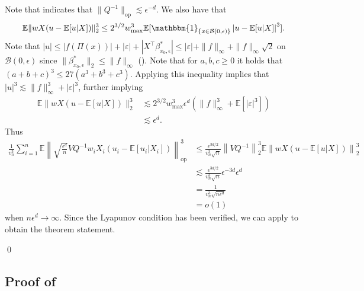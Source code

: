 \documentclass[11pt]{article}
\begin{document}
Note that  indicates that $\|Q^{-1}\|_{\text{op}} \lesssim \epsilon^{-d}$. We also have that 
\[\mathbb{E}\|wX(u - \mathbb{E}[u|X])\|_2^3 \leq 2^{3/2}w^3_{\max}\mathbb{E}[\mathbbm{1}_{\{x \in \mathcal{B}(0, \epsilon)\}}\left|u - \mathbb{E}[u|X]\right|^3].\] 
Note that $|u| \leq |f(\Pi(x))| + |\varepsilon| + |X^{\top}\beta^*_{x_0, \epsilon}| \leq |\varepsilon| + \|f\|_{\infty} + \|f\|_\infty\sqrt{2}$ on $\mathcal{B}(0, \epsilon)$ since $\|\beta^*_{x_0, \epsilon}\|_2 \leq \|f\|_{\infty}$ (). Note that for $a, b, c \geq 0$ it holds that $(a + b + c)^3 \leq 27(a^3 + b^3 + c^3)$. Applying this inequality implies that $|u|^3 \lesssim \|f\|^{3}_{\infty} + |\varepsilon|^3$, further implying
\begin{align*}
    \mathbb{E}\|wX(u - \mathbb{E}[u|X])\|_2^3 &\lesssim  2^{3/2}w^3_{\max}\epsilon^d(\|f\|_{\infty}^3+ \mathbb{E}[|\varepsilon|^3]) \\
    &\lesssim \epsilon^d.
\end{align*}
Thus
\begin{align*}
     \frac{1}{v_n^{3}}\sum_{i = 1}^n\mathbb{E}\left\|\sqrt{\frac{\epsilon^{d}}{n}}VQ^{-1}w_iX_i(u_i - \mathbb{E}[u_i|X_i])\right\|_{\text{op}}^3 
     &\leq  \frac{\epsilon^{3d/2}}{v_n^3\sqrt{n}}\left\|VQ^{-1}\right\|_2^3\mathbb{E}\left\|wX(u - \mathbb{E}[u|X])\right\|_2^3 \\
     &\lesssim \frac{\epsilon^{3d/2}}{v_n^3\sqrt{n}}\epsilon^{-3d}\epsilon^d \\
     &= \frac{1}{v_n^3\sqrt{n\epsilon^d}} \\
     &= o(1)
\end{align*}
when $n\epsilon^d \rightarrow \infty$. Since the Lyapunov condition has been verified, we can apply  to obtain the theorem statement.

\qed{}

\subsection{Proof of } \label{sec: proof of reg decomp}
\end{document}
